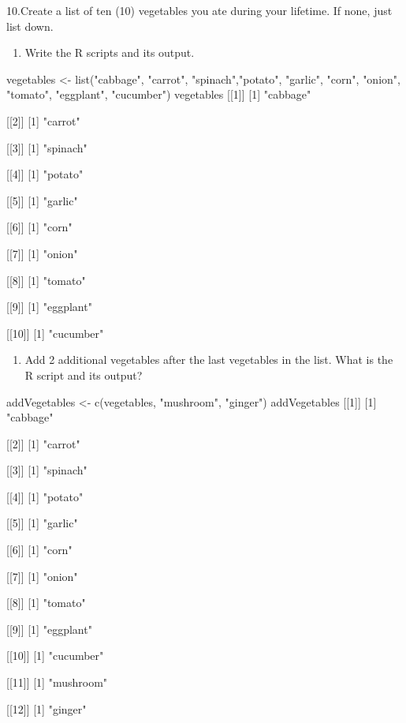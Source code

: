 \documentclass[
]{article}
\newenvironment{Shaded}{\begin{snugshade}}{\end{snugshade}}
\newcommand{\NormalTok}[1]{#1}
\providecommand{\tightlist}{%
  \setlength{\itemsep}{0pt}\setlength{\parskip}{0pt}}
\begin{document}
10.Create a list of ten (10) vegetables you ate during your lifetime. If
none, just list down.

\begin{enumerate}
\def\labelenumi{\alph{enumi}.}
\tightlist
\item
  Write the R scripts and its output.
\end{enumerate}

\begin{Shaded}
\begin{Highlighting}[]
\NormalTok{vegetables \textless{}{-} list("cabbage", "carrot", "spinach","potato", "garlic", "corn", "onion", "tomato", "eggplant", "cucumber")}
\NormalTok{vegetables}
\NormalTok{[[1]]}
\NormalTok{[1] "cabbage"}

\NormalTok{[[2]]}
\NormalTok{[1] "carrot"}

\NormalTok{[[3]]}
\NormalTok{[1] "spinach"}

\NormalTok{[[4]]}
\NormalTok{[1] "potato"}

\NormalTok{[[5]]}
\NormalTok{[1] "garlic"}

\NormalTok{[[6]]}
\NormalTok{[1] "corn"}

\NormalTok{[[7]]}
\NormalTok{[1] "onion"}

\NormalTok{[[8]]}
\NormalTok{[1] "tomato"}

\NormalTok{[[9]]}
\NormalTok{[1] "eggplant"}

\NormalTok{[[10]]}
\NormalTok{[1] "cucumber"}
\end{Highlighting}
\end{Shaded}

\begin{enumerate}
\def\labelenumi{\alph{enumi}.}
\setcounter{enumi}{1}
\tightlist
\item
  Add 2 additional vegetables after the last vegetables in the list.
  What is the R script and its output?
\end{enumerate}

\begin{Shaded}
\begin{Highlighting}[]
\NormalTok{addVegetables \textless{}{-} c(vegetables, "mushroom", "ginger")}
\NormalTok{addVegetables }
\NormalTok{[[1]]}
\NormalTok{[1] "cabbage"}

\NormalTok{[[2]]}
\NormalTok{[1] "carrot"}

\NormalTok{[[3]]}
\NormalTok{[1] "spinach"}

\NormalTok{[[4]]}
\NormalTok{[1] "potato"}

\NormalTok{[[5]]}
\NormalTok{[1] "garlic"}

\NormalTok{[[6]]}
\NormalTok{[1] "corn"}

\NormalTok{[[7]]}
\NormalTok{[1] "onion"}

\NormalTok{[[8]]}
\NormalTok{[1] "tomato"}

\NormalTok{[[9]]}
\NormalTok{[1] "eggplant"}

\NormalTok{[[10]]}
\NormalTok{[1] "cucumber"}

\NormalTok{[[11]]}
\NormalTok{[1] "mushroom"}

\NormalTok{[[12]]}
\NormalTok{[1] "ginger"}
\end{Highlighting}
\end{Shaded}
\end{document}

